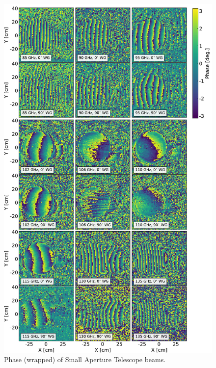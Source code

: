 \begin{figure}
    \centering
    \includegraphics[width=.75\textwidth]{Figures/sat_phase.pdf}
    \caption{Phase (wrapped) of Small Aperture Telescope beams.}
    \label{fig:sat_phases}
\end{figure}
